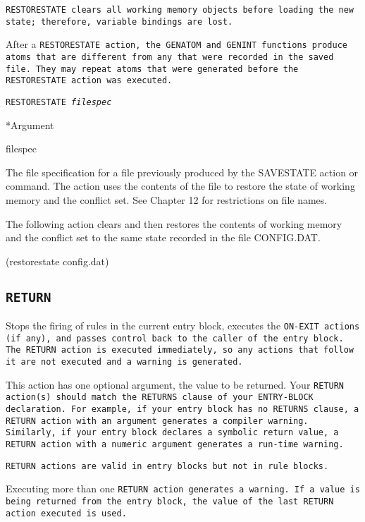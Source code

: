 {{\tt{RESTORESTATE} clears all working memory objects before loading the
new state; therefore, variable bindings are lost.

After a \tt{RESTORESTATE} action, the \tt{GENATOM} and \tt{GENINT} functions
produce atoms that are different from any that were recorded
in the saved file. They may repeat atoms that were generated
before the \tt{RESTORESTATE} action was executed.

\Format

\tt{RESTORESTATE} \it{filespec}

*Argument

filespec

The file specification for a file previously produced by the
SAVESTATE action or command. The action uses the contents of
the file to restore the state of working memory and the
conflict set. See Chapter 12 for restrictions on file names.

\Example

The following action clears and then restores the contents of
working memory and the conflict set to the same state
recorded in the file CONFIG.DAT.

(restorestate config.dat)

\subsection{\tt{RETURN}}

Stops the firing of rules in the current entry block, executes the
\tt{ON-EXIT} actions (if any), and passes control back to the caller
of the entry block. The \tt{RETURN} action is executed immediately, so
any actions that follow it are not executed and a warning is
generated.

This action has one optional argument, the value to be returned. Your
\tt{RETURN} action(s) should match the \tt{RETURNS} clause of your
\tt{ENTRY-BLOCK} declaration. For example, if your entry block has no
\tt{RETURNS} clause, a \tt{RETURN} action with an argument generates a
compiler warning. Similarly, if your entry block declares a symbolic
return value, a \tt{RETURN} action with a numeric argument generates a
run-time warning.

\tt{RETURN} actions are valid in entry blocks but not in rule blocks.

Executing more than one \tt{RETURN} action generates a warning. If
a value is being returned from the entry block, the value of
the last \tt{RETURN} action executed is used.

}}
